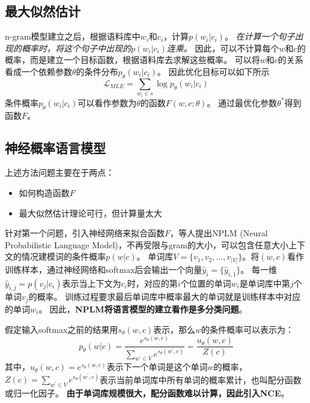 \documentclass{article}
\begin{document}
\subsection{最大似然估计}
\label{sec:NLP:MLE}
n-gram模型建立之后，根据语料库中$w_i$和$c_i$，计算$p(w_i|c_i)$。
\textit{在计算一个句子出现的概率时，将这个句子中出现的$p(w_i|c_i)$连乘。}
因此，可以不计算每个$w$和$c$的概率，而是建立一个目标函数，根据语料库去求解这些概率。
可以将$w$和$c$的关系看成一个依赖参数$\theta$的条件分布$p_\theta (w_i|c_i)$。
因此优化目标可以如下所示
\begin{equation}
    \mathcal{L}_{MLE}=\sum_{w_i\in s}\log p_\theta (w_i|c_i)
    \label{EQ:NGRAM_MLE}
\end{equation}
条件概率$p_\theta (w_i|c_i)$可以看作参数为$\theta$的函数$F(w,c;\theta)$。
通过最优化参数$\theta^*$得到函数$F$。


\subsection{神经概率语言模型}
\label{sec:NLP:NPLM}

上述方法问题主要在于两点：
\begin{itemize}
    \item 如何构造函数$F$
    \item 最大似然估计理论可行，但计算量太大
\end{itemize}

针对第一个问题，引入神经网络来拟合函数$F$，\cite{DBLP:journals/jmlr/BengioDVJ03}等人提出NPLM (Neural Probabilistic Language Model)，不再受限与gram的大小，可以包含任意大小上下文的情况建模词的条件概率$p(w|c)$。
单词库$V=\{v_1, v_2, \ldots, v_{|V|}\}$。将$(w,c)$看作训练样本，通过神经网络和softmax后会输出一个向量$\hat{y}_i=\{\hat{y}_{i,1}\}$。
每一维$\hat{y}_{i,j}=p(v_j|c_i)$表示当上下文为$c_i$时，对应的第$i$个位置的单词$w_i$是单词库中第$j$个单词$v_j$的概率。
训练过程要求最后单词库中概率最大的单词就是训练样本中对应的单词$w_i$。
因此，\textbf{NPLM将语言模型的建立看作是多分类问题}。

假定输入softmax之前的结果用$s_\theta(w,c)$表示，那么$w$的条件概率可以表示为：
\begin{equation}
    p_\theta(w|c)=\frac{e^{s_\theta(w,c)}}{\sum_{w^{'}\in V}e^{s_\theta(w^{'},c)}} = \frac{u_\theta(w,c)}{Z(c)}
    \label{EQ:NPLM_SOFTMAX}
\end{equation}
其中，$u_\theta(w,c)=e^{s_\theta(w,c)}$表示下一个单词是这个单词$w$的概率，$Z(c)=\sum_{w^{'}\in V}e^{s_\theta(w^{'},c)}$表示当前单词库中所有单词的概率累计，也叫配分函数或归一化因子。
\textbf{由于单词库规模很大，配分函数难以计算，因此引入NCE}。
\end{document}
